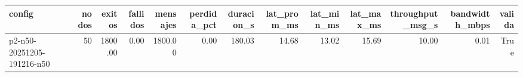 \begin{tabular}{lrrrrrrrrrrrr}
\toprule
config & nodos & exitos & fallidos & mensajes & perdida_pct & duracion_s & lat_prom_ms & lat_min_ms & lat_max_ms & throughput_msg_s & bandwidth_mbps & valida \\
\midrule
p2-n50-20251205-191216-n50 & 50 & 1800.00 & 0.00 & 1800.00 & 0.00 & 180.03 & 14.68 & 13.02 & 15.69 & 10.00 & 0.01 & True \\
\bottomrule
\end{tabular}
